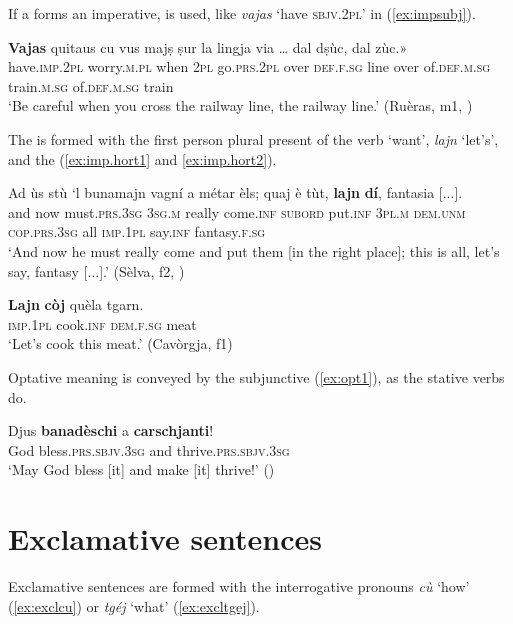 If a  forms an imperative,  is used, like \textit{vajas} `have \textsc{sbjv.2pl}' in (\ref{ex:impsubj}).

\ea
\label{ex:impsubj}
\gll    \textbf{Vajas} quitaus cu vus majṣ ṣur la lingja via … dal dṣùc, dal zùc.»\\
have.\textsc{imp.2pl} worry.\textsc{m.pl} when \textsc{2pl} go.\textsc{prs.2pl} over \textsc{def.f.sg} line over {} of.\textsc{def.m.sg} train.\textsc{m.sg} of.\textsc{def.m.sg} train\\
\glt `Be careful when you cross the railway line, the railway line.' (Ruèras, m1, )
\z

The  is formed with the first person plural present of the verb \textit{} `want', \textit{lajn} `let's', and the  (\ref{ex:imp.hort1} and \ref{ex:imp.hort2}).

\ea
\label{ex:imp.hort1}
\gll Ad ùs stù `l bunamajn vagní a métar èls; quaj è tùt, \textbf{lajn} \textbf{dí}, fantasia [...]. \\
and now must.\textsc{prs.3sg} \textsc{3sg.m} really come.\textsc{inf} \textsc{subord} put.\textsc{inf} \textsc{3pl.m} \textsc{dem.unm} \textsc{cop.prs.3sg} all \textsc{imp.1pl} say.\textsc{inf} fantasy.\textsc{f.sg}\\
\glt `And now he must really come and put them [in the right place]; this is all, let’s say, fantasy [...].' (Sèlva, f2, )
\z

\ea
\label{ex:imp.hort2}
\gll \textbf{Lajn} \textbf{còj} quèla tgarn.\\
\textsc{imp.1pl} cook.\textsc{inf} \textsc{dem.f.sg} meat\\
\glt `Let's cook this meat.' (Cavòrgja, f1)
\z

Optative meaning is conveyed by the subjunctive (\ref{ex:opt1}), as the stative verbs do.

\ea
\label{ex:opt1}
\gll Djus \textbf{banadèschi} a \textbf{carschjanti}!\\
God bless.\textsc{prs.sbjv.3sg} and thrive.\textsc{prs.sbjv.3sg}\\
\glt `May God bless [it] and make [it] thrive!' ()
\z


\section{Exclamative sentences}\label{sec:5.4}
Exclamative sentences are formed with the interrogative pronouns \textit{cù} `how' (\ref{ex:exclcu}) or \textit{tgéj} `what' (\ref{ex:excltgej}).


